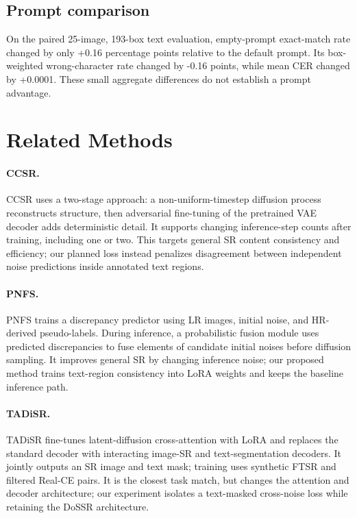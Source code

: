 \documentclass[11pt]{article}
\begin{document}
\subsection{Prompt comparison}
On the paired 25-image, 193-box text evaluation, empty-prompt exact-match rate changed by only +0.16 percentage points relative to the default prompt. Its box-weighted wrong-character rate changed by -0.16 points, while mean CER changed by +0.0001. These small aggregate differences do not establish a prompt advantage.

\section{Related Methods}
\paragraph{CCSR.} CCSR uses a two-stage approach: a non-uniform-timestep diffusion process reconstructs structure, then adversarial fine-tuning of the pretrained VAE decoder adds deterministic detail. It supports changing inference-step counts after training, including one or two. This targets general SR content consistency and efficiency; our planned loss instead penalizes disagreement between independent noise predictions inside annotated text regions. \cite[Secs.~III--IV, pp.~3--6]{sun2025ccsr}

\paragraph{PNFS.} PNFS trains a discrepancy predictor using LR images, initial noise, and HR-derived pseudo-labels. During inference, a probabilistic fusion module uses predicted discrepancies to fuse elements of candidate initial noises before diffusion sampling. It improves general SR by changing inference noise; our proposed method trains text-region consistency into LoRA weights and keeps the baseline inference path. \cite[Sec.~3, pp.~4023--4024; Sec.~4, p.~4025]{pnfs2025}

\paragraph{TADiSR.} TADiSR fine-tunes latent-diffusion cross-attention with LoRA and replaces the standard decoder with interacting image-SR and text-segmentation decoders. It jointly outputs an SR image and text mask; training uses synthetic FTSR and filtered Real-CE pairs. It is the closest task match, but changes the attention and decoder architecture; our experiment isolates a text-masked cross-noise loss while retaining the DoSSR architecture. \cite[Secs.~1, 3, and 4.1]{hu2025tadisr}
\end{document}
